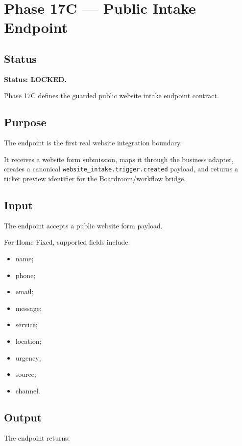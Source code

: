 \section{Phase 17C --- Public Intake Endpoint}
\label{sec:aion-phase17c-public-intake-endpoint}

\subsection{Status}

\textbf{Status: LOCKED.}

Phase 17C defines the guarded public website intake endpoint contract.

\subsection{Purpose}

The endpoint is the first real website integration boundary.

It receives a website form submission, maps it through the business adapter, creates a canonical \texttt{website\_intake.trigger.created} payload, and returns a ticket preview identifier for the Boardroom/workflow bridge.

\subsection{Input}

The endpoint accepts a public website form payload.

For Home Fixed, supported fields include:

\begin{itemize}
  \item name;
  \item phone;
  \item email;
  \item message;
  \item service;
  \item location;
  \item urgency;
  \item source;
  \item channel.
\end{itemize}

\subsection{Output}

The endpoint returns:

